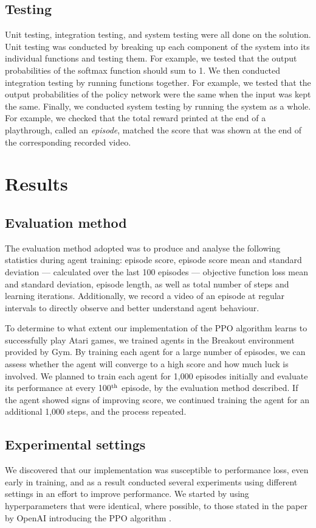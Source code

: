 \documentclass[12pt,a4paper]{article}
\begin{document}
\subsection{Testing}
Unit testing, integration testing, and system testing were all done on the solution. Unit testing was conducted by breaking up each component of the system into its individual functions and testing them. For example, we tested that the output probabilities of the softmax function should sum to 1. We then conducted integration testing by running functions together. For example, we tested that the output probabilities of the policy network were the same when the input was kept the same. Finally, we conducted system testing by running the system as a whole. For example, we checked that the total reward printed at the end of a playthrough, called an \emph{episode}, matched the score that was shown at the end of the corresponding recorded video.

\section{Results}
\subsection{Evaluation method}
The evaluation method adopted was to produce and analyse the following statistics during agent training: episode score, episode score mean and standard deviation --- calculated over the last 100 episodes --- objective function loss mean and standard deviation, episode length, as well as total number of steps and learning iterations. Additionally, we record a video of an episode at regular intervals to directly observe and better understand agent behaviour.

To determine to what extent our implementation of the PPO algorithm learns to successfully play Atari games, we trained agents in the Breakout environment provided by Gym. By training each agent for a large number of episodes, we can assess whether the agent will converge to a high score and how much luck is involved. We planned to train each agent for 1,000 episodes initially and evaluate its performance at every 100$\textsuperscript{th}$ episode, by the evaluation method described. If the agent showed signs of improving score, we continued training the agent for an additional 1,000 steps, and the process repeated. 

\subsection{Experimental settings}
We discovered that our implementation was susceptible to performance loss, even early in training, and as a result conducted several experiments using different settings in an effort to improve performance. We started by using hyperparameters that were identical, where possible, to those stated in the paper by OpenAI introducing the PPO algorithm \cite{DBLP:journals/corr/SchulmanWDRK17}. 
\end{document}
